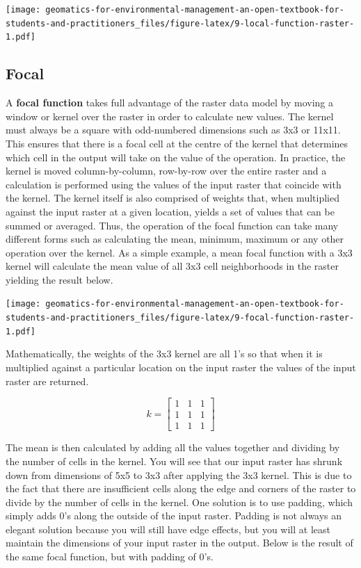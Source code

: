 \documentclass[
]{book}
\begin{document}
\texttt{[image: geomatics-for-environmental-management-an-open-textbook-for-students-and-practitioners\_files/figure-latex/9-local-function-raster-1.pdf]}

\subsection{Focal}\label{focal}

A \textbf{focal function} takes full advantage of the raster data model by moving a window or kernel over the raster in order to calculate new values. The kernel must always be a square with odd-numbered dimensions such as 3x3 or 11x11. This ensures that there is a focal cell at the centre of the kernel that determines which cell in the output will take on the value of the operation. In practice, the kernel is moved column-by-column, row-by-row over the entire raster and a calculation is performed using the values of the input raster that coincide with the kernel. The kernel itself is also comprised of weights that, when multiplied against the input raster at a given location, yields a set of values that can be summed or averaged. Thus, the operation of the focal function can take many different forms such as calculating the mean, minimum, maximum or any other operation over the kernel. As a simple example, a mean focal function with a 3x3 kernel will calculate the mean value of all 3x3 cell neighborhoods in the raster yielding the result below.

\texttt{[image: geomatics-for-environmental-management-an-open-textbook-for-students-and-practitioners\_files/figure-latex/9-focal-function-raster-1.pdf]}

Mathematically, the weights of the 3x3 kernel are all 1's so that when it is multiplied against a particular location on the input raster the values of the input raster are returned.

\[k = \begin{bmatrix}1 & 1 & 1\\
1 & 1 & 1\\
1 & 1 & 1
\end{bmatrix}\]

The mean is then calculated by adding all the values together and dividing by the number of cells in the kernel. You will see that our input raster has shrunk down from dimensions of 5x5 to 3x3 after applying the 3x3 kernel. This is due to the fact that there are insufficient cells along the edge and corners of the raster to divide by the number of cells in the kernel. One solution is to use padding, which simply adds 0's along the outside of the input raster. Padding is not always an elegant solution because you will still have edge effects, but you will at least maintain the dimensions of your input raster in the output. Below is the result of the same focal function, but with padding of 0's.
\end{document}
